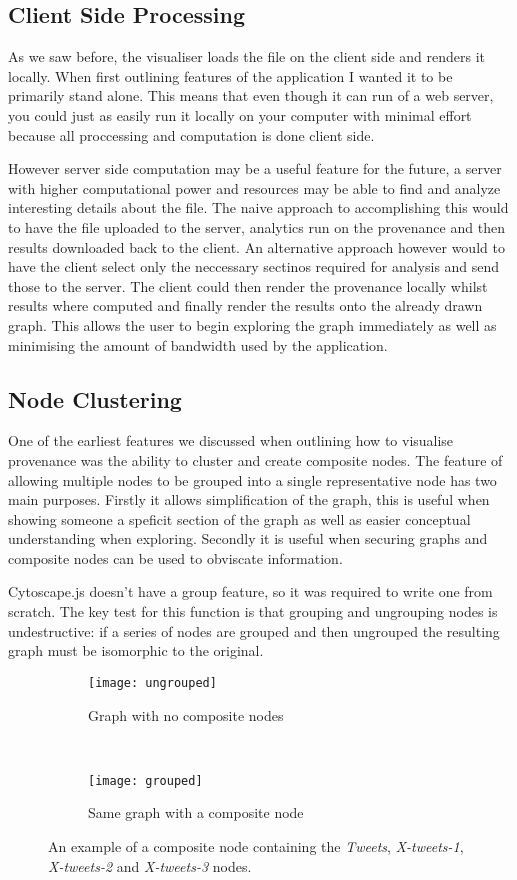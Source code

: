 \subsection{Client Side Processing}
\label{sec:client_side_processing}

As we saw before, the visualiser loads the file on the client side and renders it locally. When first outlining features of the application I wanted it to be primarily stand alone. This means that even though it can run of a web server, you could just as easily run it locally on your computer with minimal effort because all proccessing and computation is done client side. 

However server side computation may be a useful feature for the future, a server with higher computational power and resources may be able to find and analyze interesting details about the file. The naive approach to accomplishing this would to have the file uploaded to the server, analytics run on the provenance and then results downloaded back to the client. An alternative approach however would to have the client select only the neccessary sectinos required for analysis and send those to the server. The client could then render the provenance locally whilst results where computed and finally render the results onto the already drawn graph. This allows the user to begin exploring the graph immediately as well as minimising the amount of bandwidth used by the application.

\subsection{Node Clustering}
One of the earliest features we discussed when outlining how to visualise provenance was the ability to cluster and create composite nodes. The feature of allowing multiple nodes to be grouped into a single representative node has two main purposes. Firstly it allows simplification of the graph, this is useful when showing someone a speficit section of the graph as well as easier conceptual understanding when exploring. Secondly it is useful when securing graphs and composite nodes can be used to obviscate information.

Cytoscape.js doesn't have a group feature, so it was required to write one from scratch. The key test for this function is that grouping and ungrouping nodes is undestructive: if a series of nodes are grouped and then ungrouped the resulting graph must be isomorphic to the original.

\begin{figure}[h]
  \centering
  \begin{subfigure}[t]{0.5\textwidth}
    \texttt{[image: ungrouped]}
    \caption{Graph with no composite nodes}
  \end{subfigure}
  ~
  \begin{subfigure}[t]{0.5\textwidth}
    \texttt{[image: grouped]}
    \caption{Same graph with a composite node}
  \end{subfigure}
  \caption{An example of a composite node containing the \textit{Tweets}, \textit{X-tweets-1}, \textit{X-tweets-2} and \textit{X-tweets-3} nodes.}
\end{figure}

